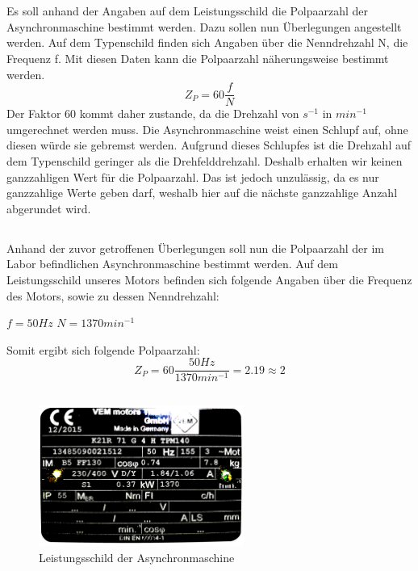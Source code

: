 \chapter{}
\section{}
Es soll anhand der Angaben auf dem Leistungsschild die Polpaarzahl der Asynchronmaschine bestimmt werden. Dazu sollen nun Überlegungen angestellt werden. Auf dem Typenschild finden sich Angaben über die Nenndrehzahl N, die Frequenz f. Mit diesen Daten kann die Polpaarzahl näherungsweise bestimmt werden.
\begin{equation}
	Z_{P} = 60\frac{f}{N}
\end{equation}
Der Faktor 60 kommt daher zustande, da die Drehzahl von $ s^{-1} $ in $ min^{-1} $ umgerechnet werden muss. Die Asynchronmaschine weist einen Schlupf auf, ohne diesen würde sie gebremst werden. Aufgrund dieses Schlupfes ist die Drehzahl auf dem Typenschild geringer als die Drehfelddrehzahl. Deshalb erhalten wir keinen ganzzahligen Wert für die  Polpaarzahl. Das ist jedoch unzulässig, da es nur ganzzahlige Werte geben darf, weshalb hier auf die nächste ganzzahlige Anzahl abgerundet wird.

\section{}
Anhand der zuvor getroffenen Überlegungen soll nun die Polpaarzahl der im Labor befindlichen Asynchronmaschine bestimmt werden. Auf dem Leistungsschild unseres Motors befinden sich folgende Angaben über die Frequenz des Motors, sowie zu dessen Nenndrehzahl:
\begin{center}
	$ f = 50Hz $ \hspace{2cm} $ N = 1370min^{-1} $
\end{center}
Somit ergibt sich folgende Polpaarzahl:
\begin{equation}
	Z_{P} = 60\frac{50Hz}{1370min^{-1}} = 2.19 \approx 2
\end{equation}

\section{}
\begin{figure}[h]
	\centering
	\includegraphics[width=0.6\textwidth]{./Bilder/Typenschild.png}
	\caption{Leistungsschild der Asynchronmaschine}
	\label{fig:4c:typenschild}
\end{figure}